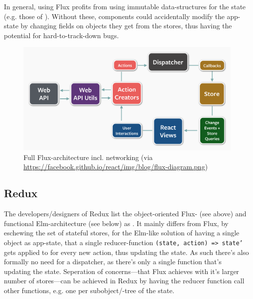In general, using Flux profits from using immutable data-structures for the state (e.g. those of ). Without these, components could accidentally modify the app-state by changing fields on objects they get from the stores, thus having the potential for hard-to-track-down bugs.

\begin{figure}
\centering
\includegraphics[width=1.0\textwidth]{figures/flux.png}
    \caption[Flux-architecture]{Full Flux-architecture incl. networking (via \url{https://facebook.github.io/react/img/blog/flux-diagram.png})}
\label{fig:flux_full}
\end{figure}
 

\subsection{Redux}\label{ref:redux}

The developers/designers of Redux list the object-oriented Flux- (see above) and functional Elm-architecture (see below) as . It mainly differs from Flux, by eschewing the set of stateful stores, for the Elm-like solution of having a single object as app-state, that a single reducer-function \texttt{(state, action) => state'} gets applied to for every new action, thus updating the state. As such there's also formally no need for a
dispatcher, as there's only a single function that's updating the state. Seperation of concerns---that Flux achieves with it's larger number of stores---can be achieved in Redux by having the reducer function call other functions, e.g. one per subobject/-tree of the state. 

